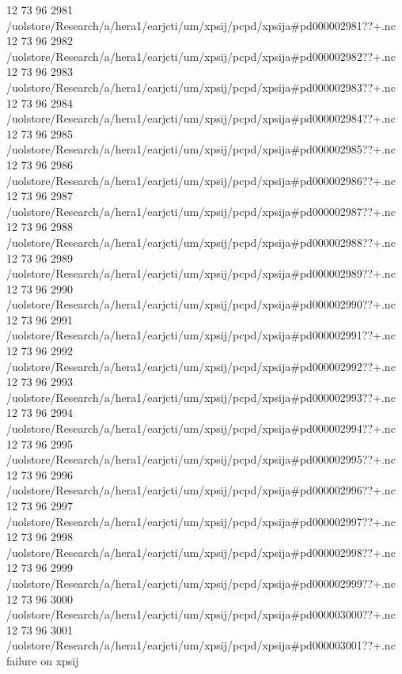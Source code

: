 12 73 96
2981
/uolstore/Research/a/hera1/earjcti/um/xpsij/pcpd/xpsija#pd000002981??+.nc
12 73 96
2982
/uolstore/Research/a/hera1/earjcti/um/xpsij/pcpd/xpsija#pd000002982??+.nc
12 73 96
2983
/uolstore/Research/a/hera1/earjcti/um/xpsij/pcpd/xpsija#pd000002983??+.nc
12 73 96
2984
/uolstore/Research/a/hera1/earjcti/um/xpsij/pcpd/xpsija#pd000002984??+.nc
12 73 96
2985
/uolstore/Research/a/hera1/earjcti/um/xpsij/pcpd/xpsija#pd000002985??+.nc
12 73 96
2986
/uolstore/Research/a/hera1/earjcti/um/xpsij/pcpd/xpsija#pd000002986??+.nc
12 73 96
2987
/uolstore/Research/a/hera1/earjcti/um/xpsij/pcpd/xpsija#pd000002987??+.nc
12 73 96
2988
/uolstore/Research/a/hera1/earjcti/um/xpsij/pcpd/xpsija#pd000002988??+.nc
12 73 96
2989
/uolstore/Research/a/hera1/earjcti/um/xpsij/pcpd/xpsija#pd000002989??+.nc
12 73 96
2990
/uolstore/Research/a/hera1/earjcti/um/xpsij/pcpd/xpsija#pd000002990??+.nc
12 73 96
2991
/uolstore/Research/a/hera1/earjcti/um/xpsij/pcpd/xpsija#pd000002991??+.nc
12 73 96
2992
/uolstore/Research/a/hera1/earjcti/um/xpsij/pcpd/xpsija#pd000002992??+.nc
12 73 96
2993
/uolstore/Research/a/hera1/earjcti/um/xpsij/pcpd/xpsija#pd000002993??+.nc
12 73 96
2994
/uolstore/Research/a/hera1/earjcti/um/xpsij/pcpd/xpsija#pd000002994??+.nc
12 73 96
2995
/uolstore/Research/a/hera1/earjcti/um/xpsij/pcpd/xpsija#pd000002995??+.nc
12 73 96
2996
/uolstore/Research/a/hera1/earjcti/um/xpsij/pcpd/xpsija#pd000002996??+.nc
12 73 96
2997
/uolstore/Research/a/hera1/earjcti/um/xpsij/pcpd/xpsija#pd000002997??+.nc
12 73 96
2998
/uolstore/Research/a/hera1/earjcti/um/xpsij/pcpd/xpsija#pd000002998??+.nc
12 73 96
2999
/uolstore/Research/a/hera1/earjcti/um/xpsij/pcpd/xpsija#pd000002999??+.nc
12 73 96
3000
/uolstore/Research/a/hera1/earjcti/um/xpsij/pcpd/xpsija#pd000003000??+.nc
12 73 96
3001
/uolstore/Research/a/hera1/earjcti/um/xpsij/pcpd/xpsija#pd000003001??+.nc
failure on xpsij
